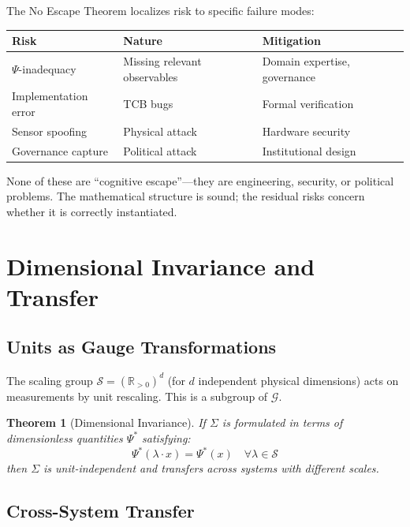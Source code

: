 \documentclass[12pt]{article}
\newtheorem{theorem}{Theorem}[section]
\begin{document}
The No Escape Theorem localizes risk to specific failure modes:

\begin{table}[h]
\centering
\begin{tabular}{lll}
\toprule
\textbf{Risk} & \textbf{Nature} & \textbf{Mitigation} \\
\midrule
$\Psi$-inadequacy & Missing relevant observables & Domain expertise, governance \\
Implementation error & TCB bugs & Formal verification \\
Sensor spoofing & Physical attack & Hardware security \\
Governance capture & Political attack & Institutional design \\
\bottomrule
\end{tabular}
\end{table}

None of these are ``cognitive escape''---they are engineering, security, or political problems. The mathematical structure is sound; the residual risks concern whether it is correctly instantiated.

\section{Dimensional Invariance and Transfer}

\subsection{Units as Gauge Transformations}

The scaling group $\mathcal{S} = (\mathbb{R}_{>0})^d$ (for $d$ independent physical dimensions) acts on measurements by unit rescaling. This is a subgroup of $\mathcal{G}$.

\begin{theorem}[Dimensional Invariance]
\textit{If $\Sigma$ is formulated in terms of dimensionless quantities $\Psi^*$ satisfying:}
\[
\Psi^*(\lambda \cdot x) = \Psi^*(x) \quad \forall \lambda \in \mathcal{S}
\]
\textit{then $\Sigma$ is unit-independent and transfers across systems with different scales.}
\end{theorem}

\subsection{Cross-System Transfer}
\end{document}
